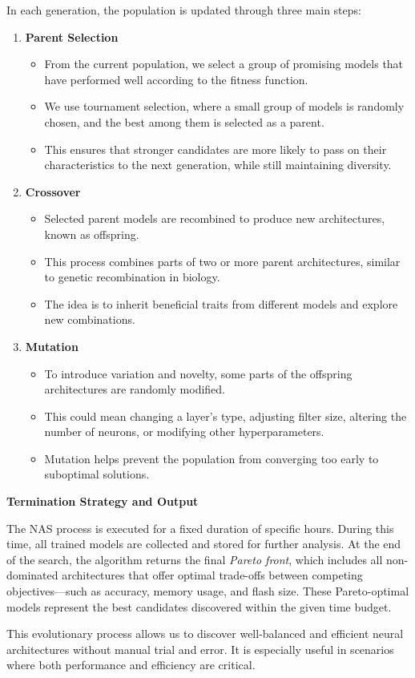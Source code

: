 In each generation, the population is updated through three main steps:
\begin{enumerate}
    \item \textbf{Parent Selection}
    \begin{itemize}
        \item From the current population, we select a group of promising models that have performed well according to the fitness function.
        \item We use tournament selection, where a small group of models is randomly chosen, and the best among them is selected as a parent.
        \item This ensures that stronger candidates are more likely to pass on their characteristics to the next generation, while still maintaining diversity.
    \end{itemize}
    \item \textbf{Crossover}
    \begin{itemize}
        \item Selected parent models are recombined to produce new architectures, known as offspring.
        \item This process combines parts of two or more parent architectures, similar to genetic recombination in biology.
        \item The idea is to inherit beneficial traits from different models and explore new combinations.


    \end{itemize}
    \item \textbf{Mutation}
    \begin{itemize}
        \item To introduce variation and novelty, some parts of the offspring architectures are randomly modified.
        \item This could mean changing a layer’s type, adjusting filter size, altering the number of neurons, or modifying other hyperparameters.
        \item Mutation helps prevent the population from converging too early to suboptimal solutions.


    \end{itemize}
\end{enumerate}
  
\textbf{Termination Strategy and Output}

The NAS process is executed for a fixed duration of specific hours. During this time, all trained models are collected and stored for further analysis. At the end of the search, the algorithm returns the final \textit{Pareto front}, which includes all non-dominated architectures that offer optimal trade-offs between competing objectives—such as accuracy, memory usage, and flash size. These Pareto-optimal models represent the best candidates discovered within the given time budget.

This evolutionary process allows us to discover well-balanced and efficient neural architectures without manual trial and error. It is especially useful in scenarios where both performance and efficiency are critical.
